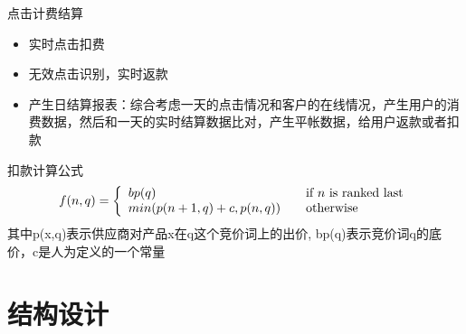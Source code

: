 \documentclass{beamer}
\begin{document}
\begin{CJK}{UTF8}{gbsn}
\begin{frame}{点击计费结算}
  \begin{itemize}
  \item {
    实时点击扣费
  }
  \item {
    无效点击识别，实时返款
  }
  \item {
    产生日结算报表：综合考虑一天的点击情况和客户的在线情况，产生用户的消费数据，然后和一天的实时结算数据比对，产生平帐数据，给用户返款或者扣款
  }
  \end{itemize}
  \pause
  \begin{block}{扣款计算公式}
    \[ f(n,q) = \left\{ 
    \begin{array}{l l}
      bp(q) & \quad \text{if $n$ is ranked last}\\
      min(p(n+1,q)+c, p(n,q)) & \quad \text{otherwise}
    \end{array} \right.\]
    其中p(x,q)表示供应商对产品x在q这个竞价词上的出价, bp(q)表示竞价词q的底价，c是人为定义的一个常量
  \end{block}
\end{frame}



\section{结构设计}


\end{CJK}
\end{document}
